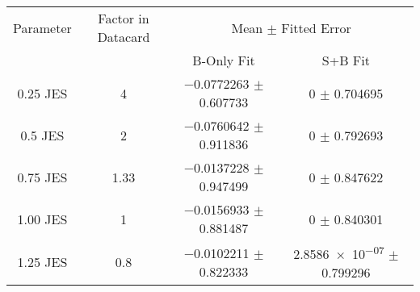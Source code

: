 \begin{scriptsize}
\begin{table}
\centering
\begin{tabular}{cccc}
\toprule
Parameter & Factor in Datacard & \multicolumn{2}{c}{{Mean $\pm$ Fitted Error}}\\
 & & {B-Only Fit} & {S+B Fit}\\
\midrule
\num[round-precision=2]{0.25} JES & 4 & \num{-0.0772263} $\pm$ \num{0.607733} & \num{0} $\pm$ \num{0.704695}\\
\num[round-precision=2]{0.5} JES & 2 & \num{-0.0760642} $\pm$ \num{0.911836} & \num{0} $\pm$ \num{0.792693}\\
\num[round-precision=2]{0.75} JES & \num[round-precision=2]{1.33} & \num{-0.0137228} $\pm$ \num{0.947499} & \num{0} $\pm$ \num{0.847622}\\
\num[round-precision=2]{1.00} JES & 1 & \num{-0.0156933} $\pm$ \num{0.881487} & \num{0} $\pm$ \num{0.840301}\\
\num[round-precision=2]{1.25} JES & \num[round-precision=2]{0.8} & \num{-0.0102211} $\pm$ \num{0.822333} & \num{2.8586e-07} $\pm$ \num{0.799296}\\

\bottomrule
\end{tabular}
\end{table}
\end{scriptsize}
